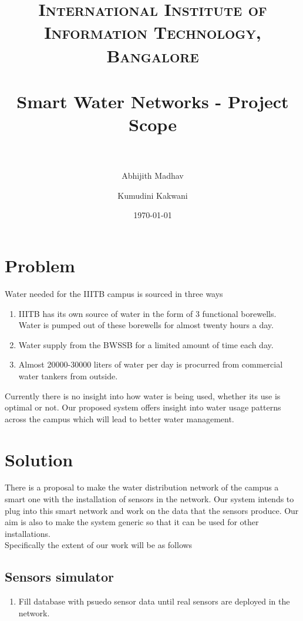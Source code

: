 \documentclass[paper=a4, fontsize=11pt]{scrartcl} %
\title{	
\normalfont \normalsize 
\textsc{International Institute of Information Technology, Bangalore} \\ [25pt] %
\horrule{0.5pt} \\[0.4cm] %
\huge Smart Water Networks - Project Scope \\ %
\horrule{2pt} \\[0.5cm] %
}
\author{Abhijith Madhav \and Kumudini Kakwani} %
\date{\normalsize\today} %
\numberwithin{equation}{section} %
\numberwithin{figure}{section} %
\numberwithin{table}{section} %
\begin{document}
\maketitle %


\section{Problem}
Water needed for the IIITB campus is sourced in three ways
\begin{enumerate}
\item
IIITB has its own source of water in the form of 3 functional borewells. Water is pumped out of these borewells for almost twenty hours a day. 
\item
Water supply from the BWSSB for a limited amount of time each day.
\item
Almost 20000-30000 liters of water per day is procurred from commercial water tankers from outside.
\end{enumerate}

Currently there is no insight into how water is being used, whether its use is optimal or not. Our proposed system offers insight into water usage patterns across the campus which will lead to better water management.

\section{Solution}
There is a proposal to make the water distribution network of the campus a smart one with the installation of sensors in the network. Our system intends to plug into this smart network and work on the data that the sensors produce. Our aim is also to make the system generic so that it can be used for other installations.\\

Specifically the extent of our work will be as follows

\subsection{Sensors simulator}
\begin{enumerate}
\item
Fill database with psuedo sensor data until real sensors are deployed in the network.
\end{enumerate}
\end{document}
